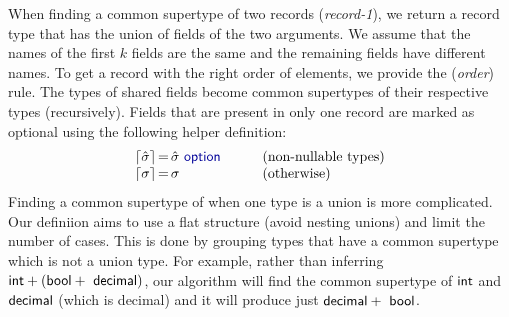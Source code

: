\documentclass[preprint]{sigplanconf}
\newcommand{\kvd}[1]{\textnormal{\textcolor{kvdclr}{\sffamily #1}}}
\newcommand{\ident}[1]{\textnormal{\sffamily #1}}
\newcommand{\narrow}[1]{\hspace{-0.85em} #1 \hspace{-0.85em}}
\newcommand{\addopt}[1]{\lceil#1\rceil}
\begin{document}
\noindent
When finding a common supertype of two records (\emph{record-1}), we return a record type that has the union
of fields of the two arguments. We assume that the names of the first $k$ fields are the same and the
remaining fields have different names. To get a record with the right order of elements, we provide the
(\emph{order}) rule. The types of shared fields become common supertypes of their 
respective types (recursively). Fields that are present in only one record are marked as optional using
the following helper definition:
%
\begin{equation*}
\begin{array}{rcll}
 \addopt{\hat{\sigma}} &\narrow{=}& \hat{\sigma}~\kvd{option} \qquad&(\textnormal{non-nullable types})\\
 \addopt{\sigma} &\narrow{=}& \sigma &(\textnormal{otherwise})
\end{array}
\end{equation*}
%
Finding a common supertype of when one type is a union is more complicated. Our definiion aims to 
use a flat structure (avoid nesting unions) and limit the number of cases. This is done by grouping
types that have a common supertype which is not a union type. For example, rather than inferring 
$\ident{int} + (\ident{bool} + \ident{decimal})$, our algorithm will find the common supertype of
$\ident{int}$ and $\ident{decimal}$ (which is \ident{decimal}) and it will produce just $\ident{decimal}+\ident{bool}$.
\end{document}
